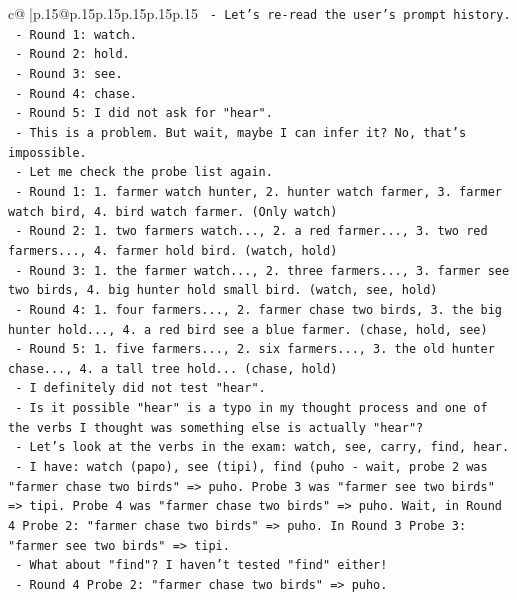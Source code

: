 \documentclass{article}
\begin{document}
{\begin{supertabular}{c@{$\;$}|p{.15\linewidth}@{}p{.15\linewidth}p{.15\linewidth}p{.15\linewidth}p{.15\linewidth}p{.15\linewidth}}
{{{\texttt{     {-} Let's re{-}read the user's prompt history.} \\
\texttt{     {-} Round 1: watch.} \\
\texttt{     {-} Round 2: hold.} \\
\texttt{     {-} Round 3: see.} \\
\texttt{     {-} Round 4: chase.} \\
\texttt{     {-} Round 5: I did not ask for "hear".} \\
\texttt{     {-} This is a problem. But wait, maybe I can infer it? No, that's impossible.} \\
\texttt{     {-} Let me check the probe list again.} \\
\texttt{     {-} Round 1: 1. farmer watch hunter, 2. hunter watch farmer, 3. farmer watch bird, 4. bird watch farmer. (Only watch)} \\
\texttt{     {-} Round 2: 1. two farmers watch..., 2. a red farmer..., 3. two red farmers..., 4. farmer hold bird. (watch, hold)} \\
\texttt{     {-} Round 3: 1. the farmer watch..., 2. three farmers..., 3. farmer see two birds, 4. big hunter hold small bird. (watch, see, hold)} \\
\texttt{     {-} Round 4: 1. four farmers..., 2. farmer chase two birds, 3. the big hunter hold..., 4. a red bird see a blue farmer. (chase, hold, see)} \\
\texttt{     {-} Round 5: 1. five farmers..., 2. six farmers..., 3. the old hunter chase..., 4. a tall tree hold... (chase, hold)} \\
\texttt{     {-} I definitely did not test "hear".} \\
\texttt{     {-} Is it possible "hear" is a typo in my thought process and one of the verbs I thought was something else is actually "hear"?} \\
\texttt{     {-} Let's look at the verbs in the exam: watch, see, carry, find, hear.} \\
\texttt{     {-} I have: watch (papo), see (tipi), find (puho {-} wait, probe 2 was "farmer chase two birds" => puho. Probe 3 was "farmer see two birds" => tipi. Probe 4 was "farmer chase two birds" => puho. Wait, in Round 4 Probe 2: "farmer chase two birds" => puho. In Round 3 Probe 3: "farmer see two birds" => tipi.} \\
\texttt{     {-} What about "find"? I haven't tested "find" either!} \\
\texttt{     {-} Round 4 Probe 2: "farmer chase two birds" => puho.} \\
}}}
\end{supertabular}}
\end{document}
